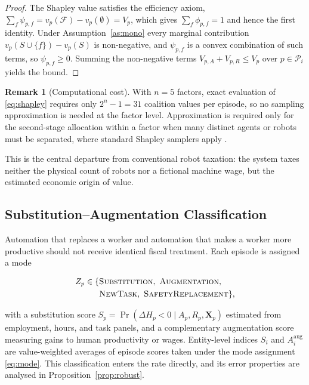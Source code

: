 \documentclass[journal]{IEEEtran}
\theoremstyle{plain}
\theoremstyle{definition}
\newtheorem{remark}{Remark}
\begin{document}
\begin{proof}
The Shapley value satisfies the efficiency axiom, $\sum_{f}\psi_{p,f} = v_p(\mathcal{F}) - v_p(\emptyset) = V_p$, which gives $\sum_f \phi_{p,f}=1$ and hence the first identity. Under Assumption~\ref{as:mono} every marginal contribution $v_p(S\cup\{f\})-v_p(S)$ is non-negative, and $\psi_{p,f}$ is a convex combination of such terms, so $\psi_{p,f}\ge 0$. Summing the non-negative terms $V_{p,A}+V_{p,R}\le V_p$ over $p\in\mathcal{P}_i$ yields the bound.
\end{proof}

\begin{remark}[Computational cost]
With $n=5$ factors, exact evaluation of \eqref{eq:shapley} requires only $2^{n}-1=31$ coalition values per episode, so no sampling approximation is needed at the factor level. Approximation is required only for the second-stage allocation within a factor when many distinct agents or robots must be separated, where standard Shapley samplers apply \cite{Jia2019}.
\end{remark}

This is the central departure from conventional robot taxation: the system taxes neither the physical count of robots nor a fictional machine wage, but the estimated economic origin of value.

\subsection{Substitution--Augmentation Classification}

Automation that replaces a worker and automation that makes a worker more productive should not receive identical fiscal treatment. Each episode is assigned a mode

\begin{equation}
\label{eq:mode}
\begin{split}
Z_p \in \{ &\textsc{Substitution},\ \textsc{Augmentation},\\
&\textsc{NewTask},\ \textsc{SafetyReplacement}\},
\end{split}
\end{equation}

with a substitution score $S_p = \Pr(\Delta H_p < 0 \mid A_p, R_p, \mathbf{X}_p)$ estimated from employment, hours, and task panels, and a complementary augmentation score measuring gains to human productivity or wages. Entity-level indices $S_i$ and $A^{\mathrm{aug}}_i$ are value-weighted averages of episode scores taken under the mode assignment \eqref{eq:mode}. This classification enters the rate directly, and its error properties are analysed in Proposition~\ref{prop:robust}.
\end{document}
